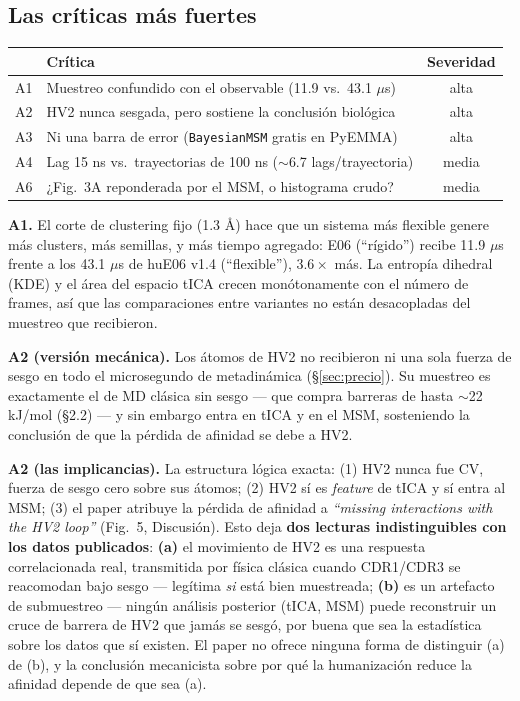 \documentclass[11pt]{article}
\begin{document}
\subsection{Las críticas más fuertes}
\begin{center}
\small
\begin{tabular}{clc}
\toprule
 & Crítica & Severidad \\
\midrule
A1 & Muestreo confundido con el observable (11.9 vs.\ 43.1 $\mu$s) & alta \\
A2 & HV2 nunca sesgada, pero sostiene la conclusión biológica & alta \\
A3 & Ni una barra de error (\texttt{BayesianMSM} gratis en PyEMMA) & alta \\
A4 & Lag 15 ns vs.\ trayectorias de 100 ns ($\sim$6.7 lags/trayectoria) & media \\
A6 & ¿Fig.\ 3A reponderada por el MSM, o histograma crudo? & media \\
\bottomrule
\end{tabular}
\end{center}

\textbf{A1.} El corte de clustering fijo (1.3 \r{A}) hace que un sistema más flexible genere más clusters, más semillas, y más tiempo agregado: E06 (``rígido'') recibe 11.9 $\mu$s frente a los 43.1 $\mu$s de huE06 v1.4 (``flexible''), $3.6\times$ más. La entropía dihedral (KDE) y el área del espacio tICA crecen monótonamente con el número de frames, así que las comparaciones entre variantes no están desacopladas del muestreo que recibieron.

\textbf{A2 (versión mecánica).} Los átomos de HV2 no recibieron ni una sola fuerza de sesgo en todo el microsegundo de metadinámica (\S\ref{sec:precio}). Su muestreo es exactamente el de MD clásica sin sesgo --- que compra barreras de hasta $\sim$22 kJ/mol (\S2.2) --- y sin embargo entra en tICA y en el MSM, sosteniendo la conclusión de que la pérdida de afinidad se debe a HV2.

\textbf{A2 (las implicancias).} La estructura lógica exacta: (1) HV2 nunca fue CV, fuerza de sesgo cero sobre sus átomos; (2) HV2 sí es \textit{feature} de tICA y sí entra al MSM; (3) el paper atribuye la pérdida de afinidad a \textit{``missing interactions with the HV2 loop''} (Fig.\ 5, Discusión). Esto deja \textbf{dos lecturas indistinguibles con los datos publicados}: \textbf{(a)} el movimiento de HV2 es una respuesta correlacionada real, transmitida por física clásica cuando CDR1/CDR3 se reacomodan bajo sesgo --- legítima \emph{si} está bien muestreada; \textbf{(b)} es un artefacto de submuestreo --- ningún análisis posterior (tICA, MSM) puede reconstruir un cruce de barrera de HV2 que jamás se sesgó, por buena que sea la estadística sobre los datos que sí existen. El paper no ofrece ninguna forma de distinguir (a) de (b), y la conclusión mecanicista sobre por qué la humanización reduce la afinidad depende de que sea (a).
\end{document}
